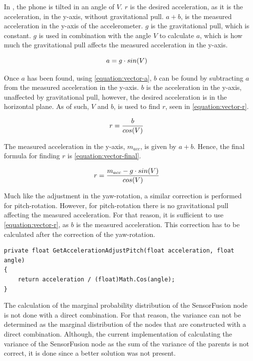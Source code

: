 In , the phone is tilted in an angle of $V$.
$r$ is the desired acceleration, as it is the acceleration, in the y-axis, without gravitational pull. 
$a + b$, is the measured acceleration in the y-axis of the accelerometer.
$g$ is the gravitational pull, which is constant.
$g$ is used in combination with the angle $V$ to calculate $a$, which is how much the gravitational pull affects the measured acceleration in the y-axis.

\begin{equation}\label{equation:vector-a}\centering
a = g \cdot sin(V)
\end{equation}

Once $a$ has been found, using \eqref{equation:vector-a}, $b$ can be found by subtracting $a$ from the measured acceleration in the y-axis.
$b$ is the acceleration in the y-axis, unaffected by gravitational pull, however, the desired acceleration is in the horizontal plane.
As of such, $V$ and $b$, is used to find $r$, seen in \eqref{equation:vector-r}.

\begin{equation}\label{equation:vector-r}\centering
    r = \frac{b}{cos(V)}
\end{equation}

The measured acceleration in the y-axis, $m_{acc}$, is given by $a + b$.
Hence, the final formula for finding $r$ is \eqref{equation:vector-final}.

\begin{equation}\label{equation:vector-final}\centering
    r = \frac{m_{acc} - g \cdot sin(V)}{cos(V)}
\end{equation}

Much like the adjustment in the yaw-rotation, a similar correction is performed for pitch-rotation. 
However, for pitch-rotation there is no gravitational pull affecting the measured acceleration. 
For that reason, it is sufficient to use \eqref{equation:vector-r}, as $b$ is the measured acceleration.
This correction has to be calculated after the correction of the yaw-rotation.  

\begin{lstlisting}[caption={Method correcting acceleration when tilted around the x-axis.}, label=lst:acceleration-pitch, float=h, style=sharpc]
private float GetAccelerationAdjustPitch(float acceleration, float angle)
{
	return acceleration / (float)Math.Cos(angle);
}
\end{lstlisting}

The calculation of the marginal probability distribution of the SensorFusion node is not done with a direct combination.
For that reason, the variance can not be determined as the marginal distribution of the nodes that are constructed with a direct combination.
Although, the current implementation of calculating the variance of the SensorFusion node as the sum of the variance of the parents is not correct, it is done since a better solution was not present.